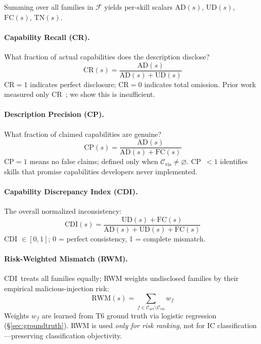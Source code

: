 Summing over all families in $\mathcal{F}$ yields per-skill scalars
$\text{AD}(s)$, $\text{UD}(s)$, $\text{FC}(s)$, $\text{TN}(s)$.

\paragraph{Capability Recall (CR).}
What fraction of actual capabilities does the description disclose?
\begin{equation}
  \text{CR}(s) = \frac{\text{AD}(s)}{\text{AD}(s)+\text{UD}(s)}
  \label{eq:cr}
\end{equation}
$\text{CR}=1$ indicates perfect disclosure; $\text{CR}=0$ indicates total omission.
Prior work measured only CR~\cite{liao2020measuring,zhang2022measuring};
we show this is insufficient.

\paragraph{Description Precision (CP).}
What fraction of claimed capabilities are genuine?
\begin{equation}
  \text{CP}(s) = \frac{\text{AD}(s)}{\text{AD}(s)+\text{FC}(s)}
  \label{eq:cp}
\end{equation}
$\text{CP}=1$ means no false claims; defined only when $\mathcal{C}_{\text{vis}} \neq \varnothing$.
CP~$< 1$ identifies skills that promise capabilities developers never implemented.

\paragraph{Capability Discrepancy Index (CDI).}
The overall normalized inconsistency:
\begin{equation}
  \text{CDI}(s) = \frac{\text{UD}(s)+\text{FC}(s)}{\text{AD}(s)+\text{UD}(s)+\text{FC}(s)}
  \label{eq:cdi}
\end{equation}
CDI $\in [0,1]$; 0 = perfect consistency, 1 = complete mismatch.

\paragraph{Risk-Weighted Mismatch (RWM).}
CDI~treats all families equally; RWM weights undisclosed families
by their empirical malicious-injection risk:
\begin{equation}
  \text{RWM}(s) = \sum_{f \in \mathcal{C}_{\text{act}} \setminus \mathcal{C}_{\text{vis}}} w_f
  \label{eq:rwm}
\end{equation}
Weights $w_f$ are learned from T6 ground truth via logistic regression
(\S\ref{sec:groundtruth}).
RWM is used \emph{only for risk ranking}, not for IC classification---preserving
classification objectivity.


